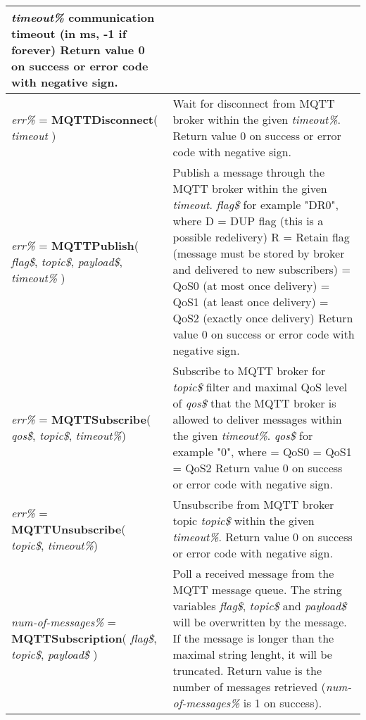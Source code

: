 \begin{table}[h!]
\begin{tabular}{|p{4cm}|p{10cm}|}
\textit{timeout\%} communication timeout (in ms, -1 if forever)\newline 
Return value 0 on success or error code with negative sign.
\\ \hline
\textit{err\%} = \textbf{MQTTDisconnect}( \textit{timeout} )
&
Wait for disconnect from MQTT broker within the given \textit{timeout\%}.
Return value 0 on success or error code with negative sign.
\\ \hline
\textit{err\%} = \textbf{MQTTPublish}( \textit{flag\$}, \textit{topic\$}, \textit{payload\$}, \textit{timeout\%} )
&
Publish a message through the MQTT broker within the given \textit{timeout}.
\textit{flag\$} for example "DR0", where\newline
   D = DUP flag (this is a possible redelivery)\newline
   R = Retain flag (message must be stored by broker and delivered to new subscribers)\newline
   0 = QoS0 (at most once delivery)\newline
   1 = QoS1 (at least once delivery)\newline
   2 = QoS2 (exactly once delivery)\newline
Return value 0 on success or error code with negative sign.
\\ \hline
\textit{err\%} = \textbf{MQTTSubscribe}( \textit{qos\$}, \textit{topic\$}, \textit{timeout\%})
&
Subscribe to MQTT broker for \textit{topic\$} filter and maximal QoS level of \textit{qos\$} that the MQTT broker is allowed to deliver messages within the given \textit{timeout\%}.\newline
\textit{qos\$} for example "0", where \newline
   0 = QoS0\newline
   1 = QoS1\newline
   2 = QoS2\newline
Return value 0 on success or error code with negative sign.   
\\ \hline
\textit{err\%} = \textbf{MQTTUnsubscribe}( \textit{topic\$}, \textit{timeout\%})
&
Unsubscribe from MQTT broker topic \textit{topic\$} within the given \textit{timeout\%}.\newline
Return value 0 on success or error code with negative sign.
\\ \hline
\textit{num-of-messages\%} = \textbf{MQTTSubscription}( \textit{flag\$}, \textit{topic\$}, \textit{payload\$} )
& 
Poll a received message from the MQTT message queue. The string variables \textit{flag\$}, \textit{topic\$} and \textit{payload\$} will be overwritten by the message. If the message is longer than the maximal string lenght, it will be truncated.\newline 
Return value is the number of messages retrieved (\textit{num-of-messages\%} is 1 on success).
\\ \hline
\end{tabular}
\end{table}

